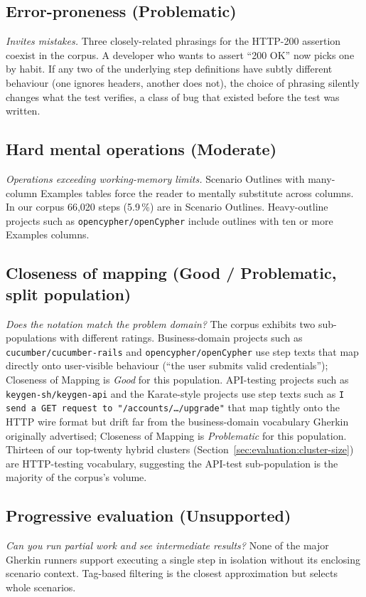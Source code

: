 \documentclass[11pt,a4paper]{article}
\begin{document}
\subsection{Error-proneness (Problematic)}
\textit{Invites mistakes.} Three closely-related phrasings for the
HTTP-200 assertion coexist in the corpus. A developer who wants to
assert ``200 OK'' now picks one by habit. If any two of the underlying
step definitions have subtly different behaviour (one ignores headers,
another does not), the choice of phrasing silently changes what the
test verifies, a class of bug that existed before the test was
written.

\subsection{Hard mental operations (Moderate)}
\textit{Operations exceeding working-memory limits.} Scenario Outlines
with many-column Examples tables force the reader to mentally
substitute across columns. In our corpus 66{,}020 steps (5.9\,\%) are
in Scenario Outlines. Heavy-outline projects such as
\texttt{opencypher/openCypher} \citep{opencypher2018} include outlines
with ten or more Examples columns.

\subsection{Closeness of mapping (Good / Problematic, split population)}
\textit{Does the notation match the problem domain?} The corpus
exhibits two sub-populations with different ratings. Business-domain
projects such as \texttt{cucumber/\allowbreak cucumber-rails} and
\texttt{opencypher/\allowbreak openCypher} \citep{opencypher2018} use
step texts that map directly onto user-visible behaviour (``the user
submits valid credentials''); Closeness of Mapping is \emph{Good} for
this population. API-testing projects such as
\texttt{keygen-sh/\allowbreak keygen-api} and the Karate-style
projects \citep{karate2020} use step texts such as
\texttt{I send a GET request to "/accounts/\ldots/upgrade"}
that map tightly onto the HTTP wire format but drift far from the
business-domain vocabulary Gherkin originally advertised; Closeness
of Mapping is \emph{Problematic} for this population.
Thirteen of our top-twenty hybrid clusters (Section~\ref{sec:evaluation:cluster-size})
are HTTP-testing vocabulary, suggesting the API-test sub-population
is the majority of the corpus's volume.

\subsection{Progressive evaluation (Unsupported)}
\textit{Can you run partial work and see intermediate results?} None
of the major Gherkin runners support executing a single step in
isolation without its enclosing scenario context. Tag-based filtering
\citep{cucumber2023tags} is the closest approximation but selects
whole scenarios.
\end{document}
